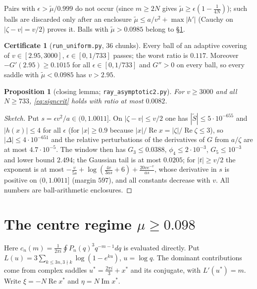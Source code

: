 \documentclass[11pt,reqno]{amsart}
\theoremstyle{plain}
\newtheorem{proposition}[theorem]{Proposition}
\theoremstyle{definition}
\newtheorem{certificate}[theorem]{Certificate}
\renewcommand{\Re}{\operatorname{Re}}
\renewcommand{\Im}{\operatorname{Im}}
\begin{document}
Pairs with $\epsilon>\tilde\mu/0.999$ do not occur (since $m\ge2N$ gives $\tilde\mu\ge\epsilon(1-\frac1{4N})$); such balls are discarded only
after an enclosure $\tilde\mu\le a/v^2+\max|h'|$ (Cauchy on $|\zeta-v|=v/2$) proves it. Balls with $\tilde\mu>0.0985$ belong to
\S\ref{sec:centre}.

\begin{certificate}[\texttt{run\_uniform.py}, 36 chunks]\label{cert:grid}
Every ball of an adaptive covering of $v\in[2.95,3000]$, $\epsilon\in[0,1/733]$ passes; the worst ratio is $0.117$.
Moreover $-G'(2.95)\ge0.1015$ for all $\epsilon\in[0,1/733]$ and $G''>0$ on every ball, so every saddle with $\tilde\mu<0.0985$ has $v>2.95$.
\end{certificate}

\begin{proposition}[closing lemma; \texttt{ray\_asymptotic2.py}]\label{prop:closing}
For $v\ge3000$ and all $N\ge733$, \eqref{eq:signcrit} holds with ratio at most $0.0082$.
\end{proposition}
\begin{proof}[Sketch]
Put $s=\epsilon v^2/a\in(0,1.0011]$. On $|\zeta-v|\le v/2$ one has $|\widetilde S|\le5\cdot10^{-655}$ and $|h(x)|\le4$ for all $\epsilon$
(for $|x|\ge0.9$ because $|x|/\Re x=|\zeta|/\Re\zeta\le3$), so $|\Delta|\le4\cdot10^{-651}$ and the relative perturbations of the derivatives
of $G$ from $a/\zeta$ are at most $4.7\cdot10^{-5}$. The window then has $G_3\le0.0388$, $\phi_4\le2\cdot10^{-3}$, $G_5\le10^{-3}$ and
lower bound $2.494$; the Gaussian tail is at most $0.0205$; for $|t|\ge v/2$ the exponent is at most
$-\frac{v}{5s}+\log(\frac{4v}{3as}+6)+\frac{20ve^{-v}}{as}$, whose derivative in $s$ is positive on $(0,1.0011]$ (margin $597$), and all
constants decrease with $v$. All numbers are ball-arithmetic enclosures.
\end{proof}

\section{The centre regime $\mu\ge0.098$}\label{sec:centre}

Here $c_n(m)=\frac1{2\pi i}\oint P_n(q)^3q^{-m-1}dq$ is evaluated directly. Put $L(u)=3\sum_{k\le3n,3\nmid k}\log(1-e^{ku})$, $u=\log q$.
The dominant contributions come from complex saddles $u^*=\frac{2\pi i}{3}+x^*$ and its conjugate, with $L'(u^*)=m$. Write
$\xi=-N\Re x^*$ and $\eta=N\Im x^*$.
\end{document}
